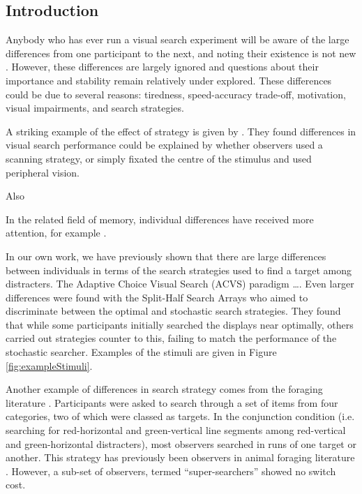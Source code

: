 \documentclass[]{rsos}%
\begin{document}
\begin{fmtext}
\section{Introduction}
Anybody who has ever run a visual search experiment will be aware of the large differences from one participant to the next, and noting their existence is not new \cite{mackworth1948}. However, these differences are largely ignored and questions about their importance and stability remain relatively under explored. These differences could be due to several reasons: tiredness\cite{mackworth1948}, speed-accuracy trade-off, motivation, visual impairments, and search strategies\cite{boot2006}. 

A striking example of the effect of strategy is given by \cite{boot2006, boot2009}. They found differences in visual search performance could be explained by whether observers used a scanning strategy, or simply fixated the centre of the stimulus and used peripheral vision. 

Also \cite{proulx2011}

In the related field of memory, individual differences have received more attention, for example \cite{sobel2007}.


In our own work, we have previously shown that there are large differences between individuals in terms of the search strategies used to find a target among distracters. The Adaptive Choice Visual Search (ACVS) paradigm  \cite{irons-leber2016} \ldots. Even larger differences were found with the Split-Half Search Arrays \cite{nowakowsak2017} who aimed to discriminate between the optimal  \cite{najemnik-geisler2008} and stochastic \cite{clarke2016} search strategies. They found that while some participants initially searched the displays near optimally, others carried out strategies counter to this, failing to match the performance of the stochastic searcher. Examples of the stimuli are given in Figure \ref{fig:exampleStimuli}. 


\end{fmtext}

\maketitle

Another example of differences in search strategy comes from the foraging literature \cite{kristjansson2014,johannesson2016}. Participants were asked to search through a set of items from four categories, two of which were classed as targets. In the conjunction condition (i.e. searching for red-horizontal and green-vertical line segments among red-vertical and green-horizontal distracters), most observers searched in runs of one target or another. This strategy has previously been observers in animal foraging literature \cite{dawkins1971}. However, a sub-set of observers, termed ``super-searchers'' showed no switch cost. 
\end{document}
